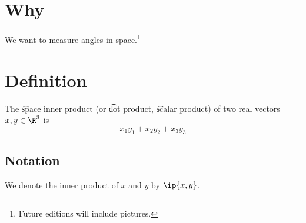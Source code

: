 
\section*{Why}

We want to measure angles in space.\footnote{Future editions will include pictures.}

\section*{Definition}

The \t{space inner product} (or \t{dot product}, \t{scalar product}) of two real vectors $x, y \in \R ^3$ is
\[
x_1y_1 + x_2y_2 + x_3y_3
\]

\subsection*{Notation}

We denote the inner product of $x$ and $y$ by $\ip{x,y}$.

\blankpage
